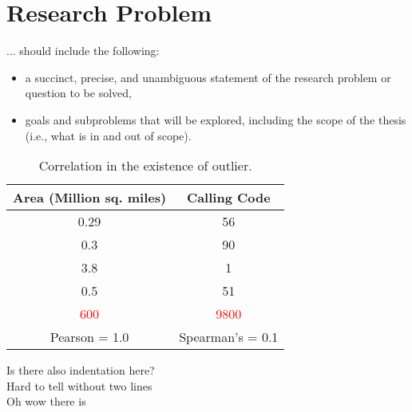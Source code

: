 \section{Research Problem }

... should include the following:
\begin{itemize}

\item a succinct, precise, and unambiguous statement of the research problem or question to be solved,
\item goals and subproblems that will be explored, including the scope of the thesis (i.e., what is in and out of scope).
\end{itemize}
\begin{comment} 
\begin{table}[h!]
\begin{center}
\begin{tabular}{ |c|c|c| } 
 \hline
 Column1 & Column2 & Column3 \\ [0.5ex] 
 \hline
 cell1 & cell2 & cell3 \\ 
 cell4 & cell5 & cell6 \\ 
 cell7 & cell8 & cell9 \\ 
 \hline
\end{tabular}
\caption{An Example Table.}
\end{center}
\end{table}
\end{comment} 


\begin{table}[ht]
\begin{center}
\footnotesize{
\begin{tabular}{ c|c } 
 \hline
  Area (Million sq. miles) & Calling Code \\
  \hline
 0.29 & 56\\
 0.3 & 90\\
 3.8 & 1\\
 0.5 & 51\\
\textcolor{red}{600} & \textcolor{red}{9800}\\
 \hline
 \multicolumn{1}{c}{Pearson = 1.0} & \multicolumn{1}{c}{Spearman’s = 0.1}
\end{tabular}
}
\caption{Correlation in the existence of outlier\cite{EsmailoghliQZ21}.}
\end{center}
\end{table}

Is there also indentation here? \\
Hard to tell without two lines\\ 
Oh wow there is 

